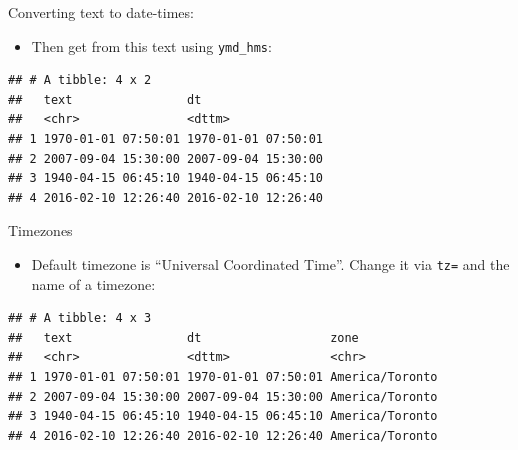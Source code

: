 \documentclass[ignorenonframetext,]{beamer}
\newenvironment{Shaded}{\begin{snugshade}}{\end{snugshade}}
\newcommand{\DataTypeTok}[1]{\textcolor[rgb]{0.13,0.29,0.53}{#1}}
\newcommand{\KeywordTok}[1]{\textcolor[rgb]{0.13,0.29,0.53}{\textbf{#1}}}
\newcommand{\NormalTok}[1]{#1}
\newcommand{\OperatorTok}[1]{\textcolor[rgb]{0.81,0.36,0.00}{\textbf{#1}}}
\newcommand{\StringTok}[1]{\textcolor[rgb]{0.31,0.60,0.02}{#1}}
\providecommand{\tightlist}{%
  \setlength{\itemsep}{0pt}\setlength{\parskip}{0pt}}
\begin{document}
\begin{frame}[fragile]{Converting text to date-times:}
\protect\hypertarget{converting-text-to-date-times}{}

\begin{itemize}
\tightlist
\item
  Then get from this text using \texttt{ymd\_hms}:
\end{itemize}

\begin{Shaded}
\end{Shaded}

\begin{verbatim}
## # A tibble: 4 x 2
##   text                dt                 
##   <chr>               <dttm>             
## 1 1970-01-01 07:50:01 1970-01-01 07:50:01
## 2 2007-09-04 15:30:00 2007-09-04 15:30:00
## 3 1940-04-15 06:45:10 1940-04-15 06:45:10
## 4 2016-02-10 12:26:40 2016-02-10 12:26:40
\end{verbatim}

\end{frame}

\begin{frame}[fragile]{Timezones}
\protect\hypertarget{timezones}{}

\begin{itemize}
\tightlist
\item
  Default timezone is ``Universal Coordinated Time''. Change it via
  \texttt{tz=} and the name of a timezone:
\end{itemize}

\begin{Shaded}
\end{Shaded}

\begin{verbatim}
## # A tibble: 4 x 3
##   text                dt                  zone           
##   <chr>               <dttm>              <chr>          
## 1 1970-01-01 07:50:01 1970-01-01 07:50:01 America/Toronto
## 2 2007-09-04 15:30:00 2007-09-04 15:30:00 America/Toronto
## 3 1940-04-15 06:45:10 1940-04-15 06:45:10 America/Toronto
## 4 2016-02-10 12:26:40 2016-02-10 12:26:40 America/Toronto
\end{verbatim}

\end{frame}
\end{document}
